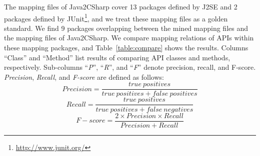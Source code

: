 The mapping files of Java2CSharp cover 13 packages defined by J2SE
and 2 packages defined by
JUnit\footnote{\url{http://www.junit.org/}}, and we treat these
mapping files as a golden standard. We find 9 packages overlapping
between the mined mapping files and the mapping files of
Java2CSharp. We compare mapping relations of APIs within these
mapping packages, and Table~\ref{table:compare} shows the results.
Columns ``Class'' and ``Method'' list results of comparing API
classes and methods, respectively. Sub-columns
``\emph{P}'', ``\emph{R}'', and ``\emph{F}'' denote precision,
recall, and F-score. \emph{Precision}, \emph{Recall}, and \emph{F-score} are defined as
follows:\vspace*{-1ex}
\begin{equation}\label{eq-precison}
Precision=\frac{true\ positives}{true\ positives+false\ positives}
\end{equation}\vspace*{-2ex}
\begin{equation}\label{eq-recall}
Recall=\frac{true\ positives}{true\ positives+false\ negatives}
\end{equation}\vspace*{-2ex}
\begin{equation}\label{eq-fscore}
F\!-\!score=\frac{2\times Precision \times Recall}{Precision+Recall}
\end{equation}\vspace*{-2ex}

